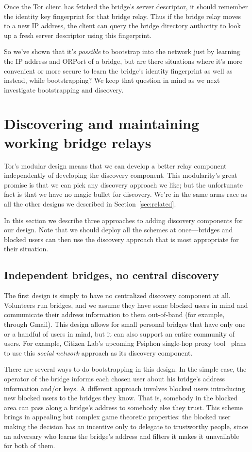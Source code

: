 \documentclass{llncs}
\begin{document}
Once the Tor client has fetched the bridge's server descriptor, it should
remember the identity key fingerprint for that bridge relay. Thus if
the bridge relay moves to a new IP address, the client can query the
bridge directory authority to look up a fresh server descriptor using
this fingerprint.

So we've shown that it's \emph{possible} to bootstrap into the network
just by learning the IP address and ORPort of a bridge, but are there
situations where it's more convenient or more secure to learn the bridge's
identity fingerprint as well as instead, while bootstrapping? We keep
that question in mind as we next investigate bootstrapping and discovery.

\section{Discovering and maintaining working bridge relays}
\label{sec:discovery}

Tor's modular design means that we can develop a better relay component
independently of developing the discovery component. This modularity's
great promise is that we can pick any discovery approach we like; but the
unfortunate fact is that we have no magic bullet for discovery. We're
in the same arms race as all the other designs we described in
Section~\ref{sec:related}.

In this section we describe three approaches to adding discovery
components for our design. Note that we should deploy all the schemes
at once---bridges and blocked users can then use the discovery approach
that is most appropriate for their situation.

\subsection{Independent bridges, no central discovery}

The first design is simply to have no centralized discovery component at
all. Volunteers run bridges, and we assume they have some blocked users
in mind and communicate their address information to them out-of-band
(for example, through Gmail). This design allows for small personal
bridges that have only one or a handful of users in mind, but it can
also support an entire community of users. For example, Citizen Lab's
upcoming Psiphon single-hop proxy tool~\cite{psiphon} plans to use this
\emph{social network} approach as its discovery component.

There are several ways to do bootstrapping in this design. In the simple
case, the operator of the bridge informs each chosen user about his
bridge's address information and/or keys. A different approach involves
blocked users introducing new blocked users to the bridges they know.
That is, somebody in the blocked area can pass along a bridge's address to
somebody else they trust. This scheme brings in appealing but complex game
theoretic properties: the blocked user making the decision has an incentive
only to delegate to trustworthy people, since an adversary who learns
the bridge's address and filters it makes it unavailable for both of them.
\end{document}
